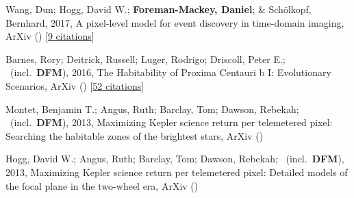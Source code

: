 \item[{\color{numcolor}\scriptsize4}] Wang, Dun; Hogg, David W.; \textbf{Foreman-Mackey, Daniel}; \& Sch{\"o}lkopf, Bernhard, 2017, A pixel-level model for event discovery in time-domain imaging, ArXiv () [\href{https://ui.adsabs.harvard.edu/abs/2017arXiv171002428W}{9 citations}]

\item[{\color{numcolor}\scriptsize3}] Barnes, Rory; Deitrick, Russell; Luger, Rodrigo; Driscoll, Peter E.; \etal\ (incl.\ \textbf{DFM}), 2016, The Habitability of Proxima Centauri b I: Evolutionary Scenarios, ArXiv () [\href{https://ui.adsabs.harvard.edu/abs/2016arXiv160806919B}{52 citations}]

\item[{\color{numcolor}\scriptsize2}] Montet, Benjamin T.; Angus, Ruth; Barclay, Tom; Dawson, Rebekah; \etal\ (incl.\ \textbf{DFM}), 2013, Maximizing Kepler science return per telemetered pixel: Searching the habitable zones of the brightest stars, ArXiv ()

\item[{\color{numcolor}\scriptsize1}] Hogg, David W.; Angus, Ruth; Barclay, Tom; Dawson, Rebekah; \etal\ (incl.\ \textbf{DFM}), 2013, Maximizing Kepler science return per telemetered pixel: Detailed models of the focal plane in the two-wheel era, ArXiv ()
